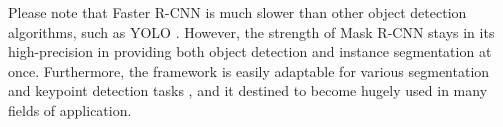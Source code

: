 Please note that Faster R-CNN is much slower \cite{medium_rcnn} than other object detection algorithms, such as YOLO \cite{redmon2016look}. However, the strength of Mask R-CNN stays in its high-precision in providing both object detection and instance segmentation at once. Furthermore, the framework is easily adaptable for various segmentation and keypoint detection tasks \cite{he2018mask} \cite{MaskRCNN_matterport} \cite{maskrcnn_explanation}, and it destined to become hugely used in many fields of application.





